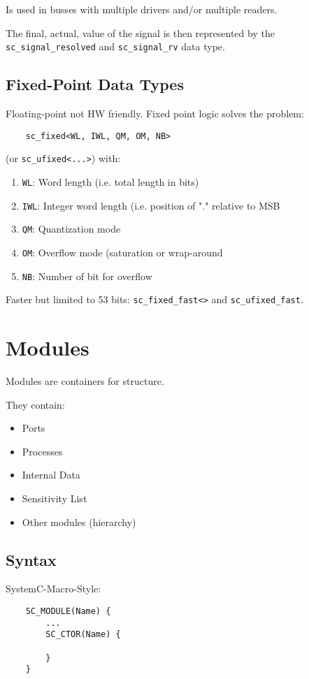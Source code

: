 Is used in busses with multiple drivers and/or multiple readers. 

The final, actual, value of the signal is then represented by the \lstinline{sc_signal_resolved} and \lstinline{sc_signal_rv} data type.

\subsection{Fixed-Point Data Types}
Floating-point not HW friendly. Fixed point logic solves the problem:
\begin{lstlisting}
    sc_fixed<WL, IWL, QM, OM, NB>
\end{lstlisting}
(or \lstinline{sc_ufixed<...>}) with:
\begin{enumerate}
    \item \lstinline{WL}: Word length (i.e. total length in bits)
    \item \lstinline{IWL}: Integer word length (i.e. position of "." relative to MSB
    \item \lstinline{QM}: Quantization mode
    \item \lstinline{OM}: Overflow mode (saturation or wrap-around
    \item \lstinline{NB}: Number of bit for overflow
\end{enumerate}

Faster but limited to 53 bits: \lstinline{sc_fixed_fast<>} and \lstinline{sc_ufixed_fast}.

\section{Modules}
Modules are containers for structure.

They contain:
\begin{itemize}
    \item Ports
    \item Processes
    \item Internal Data
    \item Sensitivity List
    \item Other modules (hierarchy)
\end{itemize}

\subsection{Syntax}
SystemC-Macro-Style:
\begin{lstlisting}
    SC_MODULE(Name) {
        ...
        SC_CTOR(Name) {

        }
    }
\end{lstlisting}


